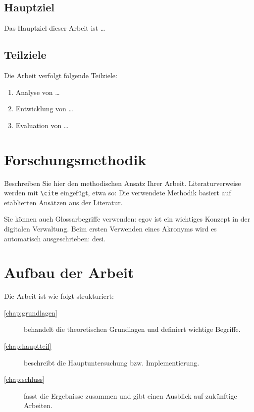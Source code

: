 \subsection{Hauptziel}
Das Hauptziel dieser Arbeit ist \dots

\subsection{Teilziele}
Die Arbeit verfolgt folgende Teilziele:
\begin{enumerate}
    \item Analyse von \dots
    \item Entwicklung von \dots
    \item Evaluation von \dots
\end{enumerate}

\section{Forschungsmethodik}
\label{sec:methodik}

Beschreiben Sie hier den methodischen Ansatz Ihrer Arbeit. Literaturverweise werden mit \texttt{\textbackslash cite} eingefügt, etwa so: Die verwendete Methodik basiert auf etablierten Ansätzen aus der Literatur.

Sie können auch Glossarbegriffe verwenden: \gls{egov} ist ein wichtiges Konzept in der digitalen Verwaltung. Beim ersten Verwenden eines Akronyms wird es automatisch ausgeschrieben: \gls{desi}.

\section{Aufbau der Arbeit}
\label{sec:aufbau}

Die Arbeit ist wie folgt strukturiert:

\begin{description}
    \item[\autoref{chap:grundlagen}] behandelt die theoretischen Grundlagen und definiert wichtige Begriffe.
    \item[\autoref{chap:hauptteil}] beschreibt die Hauptuntersuchung bzw. Implementierung.
    \item[\autoref{chap:schluss}] fasst die Ergebnisse zusammen und gibt einen Ausblick auf zukünftige Arbeiten.
\end{description}


